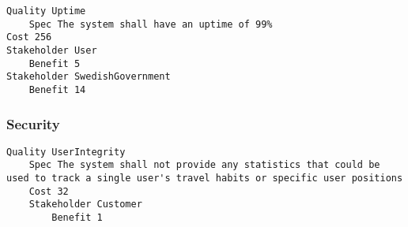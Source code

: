\begin{lstlisting}
Quality Uptime
	Spec The system shall have an uptime of 99%
Cost 256
Stakeholder User
	Benefit 5
Stakeholder SwedishGovernment
	Benefit 14

\end{lstlisting}
		
				
			 \subsubsection{Security}


\begin{lstlisting}
Quality UserIntegrity
	Spec The system shall not provide any statistics that could be used to track a single user's travel habits or specific user positions
	Cost 32
	Stakeholder Customer
		Benefit 1

\end{lstlisting}